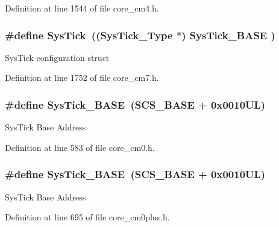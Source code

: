 Definition at line 1544 of file core\+\_\+cm4.\+h.

\subsubsection[{\texorpdfstring{Sys\+Tick}{SysTick}}]{\setlength{\rightskip}{0pt plus 5cm}\#define Sys\+Tick~(({\bf Sys\+Tick\+\_\+\+Type}   $\ast$)     {\bf Sys\+Tick\+\_\+\+B\+A\+SE}  )}\hypertarget{group___c_m_s_i_s__core__base_gacd96c53beeaff8f603fcda425eb295de}{}\label{group___c_m_s_i_s__core__base_gacd96c53beeaff8f603fcda425eb295de}
Sys\+Tick configuration struct 

Definition at line 1752 of file core\+\_\+cm7.\+h.

\subsubsection[{\texorpdfstring{Sys\+Tick\+\_\+\+B\+A\+SE}{SysTick_BASE}}]{\setlength{\rightskip}{0pt plus 5cm}\#define Sys\+Tick\+\_\+\+B\+A\+SE~({\bf S\+C\+S\+\_\+\+B\+A\+SE} +  0x0010\+U\+L)}\hypertarget{group___c_m_s_i_s__core__base_ga58effaac0b93006b756d33209e814646}{}\label{group___c_m_s_i_s__core__base_ga58effaac0b93006b756d33209e814646}
Sys\+Tick Base Address 

Definition at line 583 of file core\+\_\+cm0.\+h.

\subsubsection[{\texorpdfstring{Sys\+Tick\+\_\+\+B\+A\+SE}{SysTick_BASE}}]{\setlength{\rightskip}{0pt plus 5cm}\#define Sys\+Tick\+\_\+\+B\+A\+SE~({\bf S\+C\+S\+\_\+\+B\+A\+SE} +  0x0010\+U\+L)}\hypertarget{group___c_m_s_i_s__core__base_ga58effaac0b93006b756d33209e814646}{}\label{group___c_m_s_i_s__core__base_ga58effaac0b93006b756d33209e814646}
Sys\+Tick Base Address 

Definition at line 695 of file core\+\_\+cm0plus.\+h.

